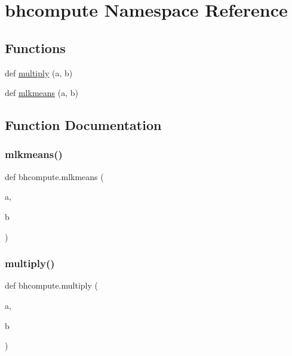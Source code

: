 \hypertarget{namespacebhcompute}{}\section{bhcompute Namespace Reference}
\label{namespacebhcompute}
\subsection*{Functions}
\begin{DoxyCompactItemize}
\item 
def \mbox{\hyperlink{namespacebhcompute_a9993be8ce88198085d067eb9d777fc6a}{multiply}} (a, b)
\item 
def \mbox{\hyperlink{namespacebhcompute_a7a8340e63a09c23e5e93dba91ad0d336}{mlkmeans}} (a, b)
\end{DoxyCompactItemize}


\subsection{Function Documentation}
\mbox{\label{namespacebhcompute_a7a8340e63a09c23e5e93dba91ad0d336}} 
\subsubsection{\texorpdfstring{mlkmeans()}{mlkmeans()}}
{\footnotesize\ttfamily def bhcompute.\+mlkmeans (\begin{DoxyParamCaption}\item[{}]{a,  }\item[{}]{b }\end{DoxyParamCaption})}

\mbox{\label{namespacebhcompute_a9993be8ce88198085d067eb9d777fc6a}} 
\subsubsection{\texorpdfstring{multiply()}{multiply()}}
{\footnotesize\ttfamily def bhcompute.\+multiply (\begin{DoxyParamCaption}\item[{}]{a,  }\item[{}]{b }\end{DoxyParamCaption})}

